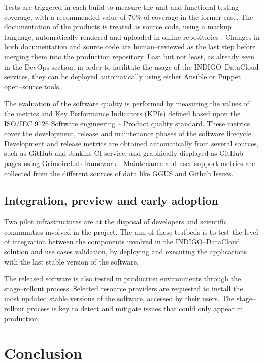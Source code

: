 \documentclass[journal]{IEEEtran}
\begin{document}
Tests are triggered in each build to measure the unit and functional testing coverage, with a recommended value of 70\% of coverage in the former case. The documentation of the products is treated as source code, using a markup language, automatically rendered and uploaded in online repositories \cite{indigo-gitbook}. Changes in both documentation and source code are human--reviewed as the last step before merging them into the production repository. Last but not least, as already seen in the DevOps section, in order to facilitate the usage of the INDIGO--DataCloud services, they can be deployed automatically using either Ansible \cite{indigo-ansible} or Puppet \cite{indigo-puppet} open--source tools.

The evaluation of the software quality is performed by measuring the values of the metrics and Key Performance Indicators (KPIs) defined based upon the ISO/IEC 9126 Software engineering -- Product quality standard. These metrics cover the development, release and maintenance phases of the software lifecycle. Development and release metrics are obtained automatically from several sources, such as GitHub and Jenkins CI service, and graphically displayed as GitHub pages using GrimoireLab framework \cite{grimoirelab}. Maintenance and user support metrics are collected from the different sources of data like GGUS \cite{ggus} and Github Issues.

\subsection{Integration, preview and early adoption}

Two pilot infrastructures are at the disposal of developers and scientific communities involved in the project. The aim of these testbeds is to test the level of integration between the components involved in the INDIGO--DataCloud solution and use cases validation, by deploying and executing the applications with the last stable version of the software.

The released software is also tested in production environments through the stage--rollout process. Selected resource providers are requested to install the most updated stable versions of the software, accessed by their users. The stage--rollout process is key to detect and mitigate issues that could only appear in production.

\section{Conclusion}
\end{document}
